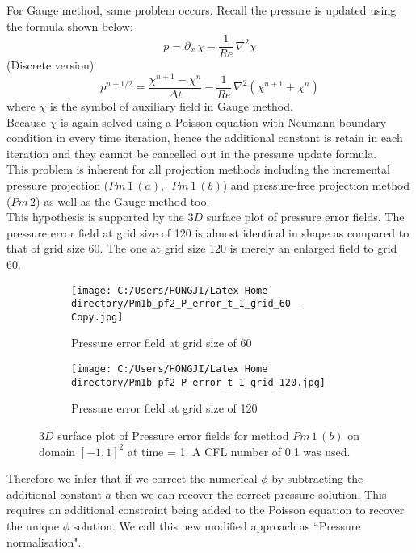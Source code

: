For Gauge method, same problem occurs. Recall the pressure is updated using the formula shown below:
\begin{equation*}
p = \partial_x\,\chi - \dfrac{1}{Re}\,\nabla^2 \chi
\end{equation*}
(Discrete version)
\begin{equation*}
p^{n+1/2} = \dfrac{\chi^{n+1} - \chi^{n}}{\Delta t} - \dfrac{1}{Re}\,\nabla^2(\chi^{n+1} + \chi^n)
\end{equation*}
where $\chi$ is the symbol of auxiliary field in Gauge method. \\
Because $\chi$ is again solved using a Poisson equation with Neumann boundary condition in every time iteration, hence the additional constant is retain in each iteration and they cannot be cancelled out in the pressure update formula. \\


This problem is inherent for all projection methods including the incremental pressure projection ($Pm\,1\,(a),\,\,\,Pm\,1\,(b)$) and pressure-free projection method ($Pm\,2$) as well as the Gauge method too.\\

This hypothesis is supported by the $3D$ surface plot of pressure error fields. The pressure error field at grid size of 120 is almost identical in shape as compared to that of grid size 60. The one at grid size 120 is merely an enlarged field to grid 60.\\

\begin{figure}[H]
	\centering
	\begin{subfigure}[t]{2.5in}
		\centering
		\texttt{[image: C:/Users/HONGJI/Latex Home directory/Pm1b\_pf2\_P\_error\_t\_1\_grid\_60 - Copy.jpg]}
		\caption{Pressure error field at grid size of 60}\label{fig:6.19a}		
	\end{subfigure}
	\quad
	\begin{subfigure}[t]{2.5in}
		\centering
		\texttt{[image: C:/Users/HONGJI/Latex Home directory/Pm1b\_pf2\_P\_error\_t\_1\_grid\_120.jpg]}
		\caption{Pressure error field at grid size of 120}\label{fig:6.19b}
	\end{subfigure}
	\caption{$3D$ surface plot of Pressure error fields for method $Pm\,1\,(b)$ on domain $[-1,1]^2$ at time = 1. A CFL number of 0.1 was used.}\label{fig:6.16}
\end{figure}

Therefore we infer that if we correct the numerical $\phi$ by subtracting the additional constant $a$ then we can recover the correct pressure solution. This requires an additional constraint being added to the Poisson equation to recover the unique $\phi$ solution. We call this new modified approach as ``Pressure normalisation".\\


